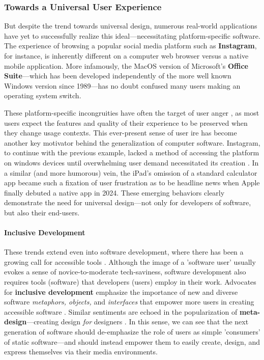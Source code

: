 \documentclass{report}
\newcommand{\tech}[1]{\textbf{#1}}
\begin{document}
\subsubsection{Towards a Universal User Experience}
But despite the trend towards universal design, numerous real-world applications have yet to successfully realize this ideal---necessitating platform-specific software. The experience of browsing a popular social media platform such as \tech{Instagram}, for instance, is inherently different on a computer web browser versus a native mobile application. More infamously, the MacOS version of Microsoft's \tech{Office Suite}---which has been developed independently of the more well known Windows version since 1989---has no doubt confused many users making an operating system switch.

These platform-specific incongruities have often the target of user anger \cite{Paquin_2010}, as most users expect the features and quality of their experience to be preserved when they change usage contexts. This ever-present sense of user ire has become another key motivator behind the generalization of computer software. Instagram, to continue with the previous example, lacked a method of accessing the platform on windows devices until overwhelming user demand necessitated its creation \cite{Warren2013}. In a similar (and more humorous) vein, the iPad's omission of a standard calculator app became such a fixation of user frustration as to be headline news \cite{Weinstein_2024} when Apple finally debuted a native app in 2024. These emerging behaviors clearly demonstrate the need for universal design---not only for developers of software, but also their end-users. 

\paragraph{Inclusive Development}
These trends extend even into software development, where there has been a growing call for accessible tools \cite{maeda2021cx}. Although the image of a 'software user' usually evokes a sense of novice-to-moderate tech-saviness, software development also requires tools (software) that developers (users) employ in their work. Advocates for \tech{inclusive development} emphasize the importance of new and diverse software \emph{metaphors, objects,} and \emph{interfaces} that empower more users in creating accessible software \cite{savidis2006inclusive}. Similar sentiments are echoed in the popularization of \tech{meta-design}---creating design \emph{for} designers \cite{fischer2000meta}. In this sense, we can see that the next generation of software should de-emphasize the role of users as simple 'consumers' of static software---and should instead empower them to easily create, design, and express themselves via their media environments. 
\end{document}
